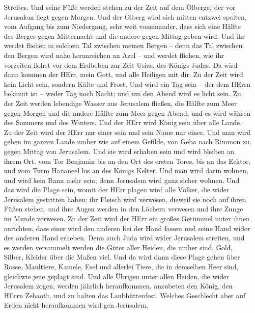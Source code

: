 Streites.  Und seine Füße werden stehen zu der Zeit auf dem
Ölberge, der vor Jerusalem liegt gegen Morgen. Und der Ölberg wird sich
mitten entzwei spalten, vom Aufgang bis zum Niedergang, sehr weit
voneinander, dass sich eine Hälfte des Berges gegen Mitternacht und die
andere gegen Mittag geben wird.  Und ihr werdet fliehen in
solchem Tal zwischen meinen Bergen -- denn das Tal zwischen den Bergen
wird nahe heranreichen an Azel -- und werdet fliehen, wie ihr vorzeiten
flohet vor dem Erdbeben zur Zeit Usias, des Königs Judas. Da wird dann
kommen der HErr, mein Gott, und alle Heiligen mit dir.  Zu
der Zeit wird kein Licht sein, sondern Kälte und Frost.  Und
wird ein Tag sein -- der dem HErrn bekannt ist -- weder Tag noch Nacht;
und um den Abend wird es licht sein.  Zu der Zeit werden
lebendige Wasser aus Jerusalem fließen, die Hälfte zum Meer gegen Morgen
und die andere Hälfte zum Meer gegen Abend; und es wird währen des
Sommers und des Winters.  Und der HErr wird König sein über
alle Lande. Zu der Zeit wird der HErr nur einer sein und sein Name nur
einer.  Und man wird gehen im ganzen Lande umher wie auf
einem Gefilde, von Geba nach Rimmon zu, gegen Mittag von Jerusalem. Und
sie wird erhaben sein und wird bleiben an ihrem Ort, vom Tor Benjamin
bis an den Ort des ersten Tores, bis an das Ecktor, und vom Turm
Hananeel bis an des Königs Kelter.  Und man wird darin
wohnen, und wird kein Bann mehr sein; denn Jerusalem wird ganz sicher
wohnen.  Und das wird die Plage sein, womit der HErr plagen
wird alle Völker, die wider Jerusalem gestritten haben; ihr Fleisch wird
verwesen, dieweil sie noch auf ihren Füßen stehen, und ihre Augen werden
in den Löchern verwesen und ihre Zunge im Munde verwesen. 
Zu der Zeit wird der HErr ein großes Getümmel unter ihnen anrichten,
dass einer wird den anderen bei der Hand fassen und seine Hand wider des
anderen Hand erheben.  Denn auch Juda wird wider Jerusalem
streiten, und es werden versammelt werden die Güter aller Heiden, die
umher sind, Gold, Silber, Kleider über die Maßen viel.  Und
da wird dann diese Plage gehen über Rosse, Maultiere, Kamele, Esel und
allerlei Tiere, die in demselben Heer sind, gleichwie jene geplagt sind.
 Und alle Übrigen unter allen Heiden, die wider Jerusalem
zogen, werden jährlich heraufkommen, anzubeten den König, den HErrn
Zebaoth, und zu halten das Laubhüttenfest.  Welches
Geschlecht aber auf Erden nicht heraufkommen wird gen Jerusalem,
